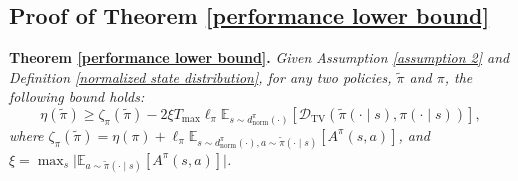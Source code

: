 \documentclass{article}
\theoremstyle{plain}
\theoremstyle{definition}
\theoremstyle{remark}
\begin{document}
\subsection{Proof of Theorem \ref{performance lower bound}} \label{proof of performance lower bound}
\textbf{Theorem \ref{performance lower bound}.} \textit{
	Given Assumption \ref{assumption 2} and Definition \ref{normalized state distribution}, for any two policies, $\tilde{\pi}$ and $\pi$, the following bound holds:
	\begin{equation}
		\eta(\tilde{\pi})\geq\zeta_\pi(\tilde{\pi}) - 2\xi T_{\max}\ell_\pi\mathbb{E}_{s \sim d^{\pi}_{\mathrm{norm}}(\cdot)}\left[\mathcal{D}_{\mathrm{TV}}(\tilde{\pi}(\cdot \mid s),\pi(\cdot \mid s))\right],
	\end{equation}
	where $\zeta_\pi(\tilde{\pi})=\eta(\pi) + \ell_\pi\mathbb{E}_{s \sim d^\pi_{\mathrm{norm}}(\cdot), a \sim \tilde{\pi}(\cdot \mid s)} \left[ A^\pi(s, a) \right]$, and $\xi=\max_{s}\lvert\mathbb{E}_{a\sim\tilde{\pi}(\cdot\mid s)}\left[A^\pi(s,a)\right]\rvert$.
}
\end{document}
